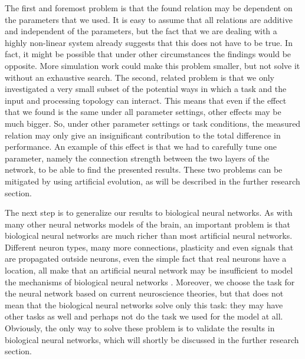 \documentclass[10pt,a4paper]{report}
\begin{document}
The first and foremost problem is that the found relation may be dependent on the parameters that we used. It is easy to assume that all relations are additive and independent of the parameters, but the fact that we are dealing with a highly non-linear system already suggests that this does not have to be true. In fact, it might be possible that under other circumstances the findings would be opposite. More simulation work could make this problem smaller, but not solve it without an exhaustive search. The second, related problem is that we only investigated a very small subset of the potential ways in which a task and the input and processing topology can interact. This means that even if the effect that we found is the same under all parameter settings, other effects may be much bigger. So, under other parameter settings or task conditions, the measured relation may only give an insignificant contribution to the total difference in performance. An example of this effect is that we had to carefully tune one parameter, namely the connection strength between the two layers of the network, to be able to find the presented results. These two problems can be mitigated by using artificial evolution, as will be described in the further research section.

The next step is to generalize our results to biological neural networks. As with many other neural networks models of the brain, an important problem is that biological neural networks are much richer than most artificial neural networks. Different neuron types, many more connections, plasticity and even signals that are propagated outside neurons, even the simple fact that real neurons have a location, all make that an artificial neural network may be insufficient to model the mechanisms of biological neural networks \citep{Anderson1995}. Moreover, we choose the task for the neural network based on current neuroscience theories, but that does not mean that the biological neural networks solve only this task: they may have other tasks as well and perhaps not do the task we used for the model at all. Obviously, the only way to solve these problem is to validate the results in biological neural networks, which will shortly be discussed in the further research section.
\end{document}

